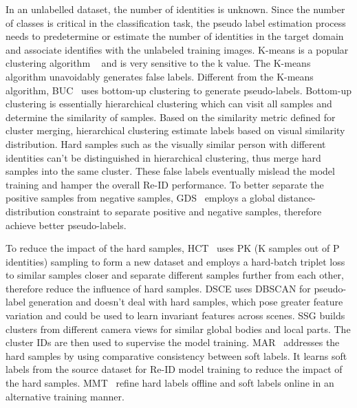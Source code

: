 \documentclass[a4paper,fleqn]{cas-dc}
\begin{document}
In an unlabelled dataset, the number of identities is unknown. Since the number of classes is critical in the classification task, the pseudo label estimation process needs to predetermine or estimate the number of identities in the target domain and associate identifies with the unlabeled training images. K-means is a popular clustering algorithm ~\cite{fan_unsupervised_2018} and is very sensitive to the k value. The K-means algorithm unavoidably generates false labels. Different from the K-means algorithm, BUC~\cite{lin_bottom-up_2019} uses bottom-up clustering to generate pseudo-labels. Bottom-up clustering is essentially hierarchical clustering which can visit all samples and determine the similarity of samples. Based on the similarity metric defined for cluster merging, hierarchical clustering estimate labels based on visual similarity distribution. Hard samples such as the visually similar person with different identities can't be distinguished in hierarchical clustering, thus merge hard samples into the same cluster. These false labels eventually mislead the model training and hamper the overall Re-ID performance. To better separate the positive samples from negative samples, GDS~\cite{vedaldi_global_2020} employs a global distance-distribution constraint to separate positive and negative samples, therefore achieve better pseudo-labels.  

To reduce the impact of the hard samples, HCT~\cite{zeng_hierarchical_2020} uses PK (K samples out of P identities) sampling to form a new dataset and employs a hard-batch triplet loss to similar samples closer and separate different samples further from each other, therefore reduce the influence of hard samples. DSCE\cite{yang_joint_2021} uses DBSCAN for pseudo-label generation and doesn't deal with hard samples, which pose greater feature variation and could be used to learn invariant features across scenes. SSG \cite{fu_self-similarity_2019} builds clusters from different camera views for similar global bodies and local parts. The cluster IDs are then used to supervise the model training. MAR~\cite{yu_unsupervised_2019} addresses the hard samples by using comparative consistency between soft labels. It learns soft labels from the source dataset for Re-ID model training to reduce the impact of the hard samples. MMT~\cite{ge_mutual_2020} refine hard labels offline and soft labels online in an alternative training manner. 
\end{document}
